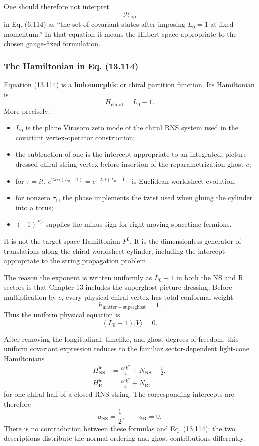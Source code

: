 \documentclass[
  10pt,
  a4paper,
  openany]{book}
\providecommand{\tightlist}{%
  \setlength{\itemsep}{0pt}\setlength{\parskip}{0pt}}
\begin{document}
One should therefore not interpret \[
\mathcal H_{\mathrm{op}}
\] in Eq. (6.114) as ``the set of covariant states after imposing
\(L_0=1\) at fixed momentum.'' In that equation it means the Hilbert
space appropriate to the chosen gauge-fixed formulation.

\subsubsection{The Hamiltonian in Eq.
(13.114)}\label{the-hamiltonian-in-eq.-13.114}

Equation (13.114) is a \textbf{holomorphic} or chiral partition
function. Its Hamiltonian is \[
\boxed{
H_{\mathrm{chiral}}=L_0-1.
}
\] More precisely:

\begin{itemize}
\tightlist
\item
  \(L_0\) is the plane Virasoro zero mode of the chiral RNS system used
  in the covariant vertex-operator construction;
\item
  the subtraction of one is the intercept appropriate to an integrated,
  picture-dressed chiral string vertex before insertion of the
  reparametrization ghost \(c\);
\item
  for \(\tau=it\), \(e^{2\pi i\tau(L_0-1)}=e^{-2\pi t(L_0-1)}\) is
  Euclidean worldsheet evolution;
\item
  for nonzero \(\tau_1\), the phase implements the twist used when
  gluing the cylinder into a torus;
\item
  \((-1)^{F_R}\) supplies the minus sign for right-moving spacetime
  fermions.
\end{itemize}

It is not the target-space Hamiltonian \(P^0\). It is the dimensionless
generator of translations along the chiral worldsheet cylinder,
including the intercept appropriate to the string propagation problem.

The reason the exponent is written uniformly as \(L_0-1\) in both the NS
and R sectors is that Chapter 13 includes the superghost picture
dressing. Before multiplication by \(c\), every physical chiral vertex
has total conformal weight \[
h_{\mathrm{matter+superghost}}=1.
\] Thus the uniform physical equation is \[
(L_0-1)|V\rangle=0.
\]

After removing the longitudinal, timelike, and ghost degrees of freedom,
this uniform covariant expression reduces to the familiar
sector-dependent light-cone Hamiltonians \[
\boxed{
\begin{aligned}
H_{\mathrm{NS}}^{\mathrm{lc}}
&=
\frac{\alpha'k^2}{4}
+N_{\mathrm{NS}}-\frac12,\\%
H_{\mathrm R}^{\mathrm{lc}}
&=
\frac{\alpha'k^2}{4}
+N_{\mathrm R},
\end{aligned}
}
\] for one chiral half of a closed RNS string. The corresponding
intercepts are therefore \[
a_{\mathrm{NS}}=\frac12,
\qquad
a_{\mathrm R}=0.
\] There is no contradiction between these formulas and Eq. (13.114):
the two descriptions distribute the normal-ordering and ghost
contributions differently.
\end{document}
